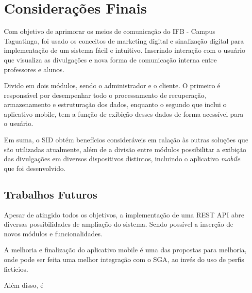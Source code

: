 \chapter[Considerações Finais]{Considerações Finais}
Com objetivo de aprimorar os meios de comunicação do IFB - Campus Taguatinga, foi usado os conceitos de marketing digital e sinalização digital para implementação de um sistema fácil e intuitivo. Inserindo interação com o usuário que visualiza as divulgações e nova forma de comunicação interna entre professores e alunos.  

Divido em dois módulos, sendo o administrador e o cliente. O primeiro é responsável por desempenhar todo o processamento de recuperação, armazenamento e estruturação dos dados, enquanto o segundo que inclui o aplicativo mobile, tem a função de exibição desses dados de forma acessível para o usuário.  

Em suma, o SID obtém benefícios consideráveis em ralação às outras soluções que são utilizadas atualmente, além de a divisão entre módulos possibilitar a exibição das divulgações em diversos dispositivos distintos, incluindo o aplicativo \textit{mobile} que foi desenvolvido.

\section{Trabalhos Futuros}
Apesar de atingido todos os objetivos, a implementação de uma REST API abre diversas possibilidades de ampliação do sistema. Sendo possível a inserção de novos módulos e funcionalidades.

A melhoria e finalização do aplicativo mobile é uma das propostas para melhoria, onde pode ser feita uma melhor integração com o SGA, ao invés do uso de perfis fictícios.

Além disso, é 
